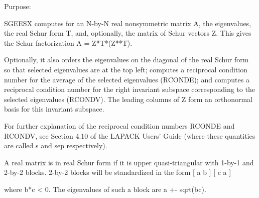  \begin{DoxyParagraph}{Purpose\+: }
\begin{DoxyVerb} SGEESX computes for an N-by-N real nonsymmetric matrix A, the
 eigenvalues, the real Schur form T, and, optionally, the matrix of
 Schur vectors Z.  This gives the Schur factorization A = Z*T*(Z**T).

 Optionally, it also orders the eigenvalues on the diagonal of the
 real Schur form so that selected eigenvalues are at the top left;
 computes a reciprocal condition number for the average of the
 selected eigenvalues (RCONDE); and computes a reciprocal condition
 number for the right invariant subspace corresponding to the
 selected eigenvalues (RCONDV).  The leading columns of Z form an
 orthonormal basis for this invariant subspace.

 For further explanation of the reciprocal condition numbers RCONDE
 and RCONDV, see Section 4.10 of the LAPACK Users' Guide (where
 these quantities are called s and sep respectively).

 A real matrix is in real Schur form if it is upper quasi-triangular
 with 1-by-1 and 2-by-2 blocks. 2-by-2 blocks will be standardized in
 the form
           [  a  b  ]
           [  c  a  ]

 where b*c < 0. The eigenvalues of such a block are a +- sqrt(bc).\end{DoxyVerb}
 
\end{DoxyParagraph}

